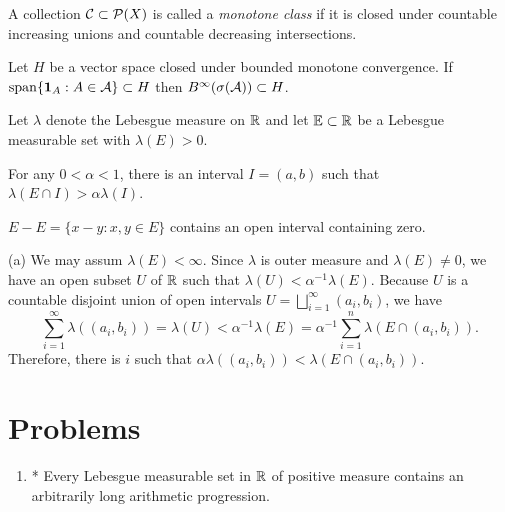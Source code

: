 \documentclass{../../large}
\begin{document}
\begin{prb}
A collection $\mathcal{C}\subset\mathcal{P}(X)$ is called a \emph{monotone class} if it is closed under countable increasing unions and countable decreasing intersections.

Let $H$ be a vector space closed under bounded monotone convergence.
If $\operatorname{span}\{\mathbf{1}_A:A\in\mathcal{A}\}\subset H$ then $B^\infty(\sigma(\mathcal{A}))\subset H$.
\end{prb}



\begin{prb}
Let $\lambda$ denote the Lebesgue measure on $\mathbb{R}$ and let $\mathbb{E}\subset\mathbb{R}$ be a Lebesgue measurable set with $\lambda(E)>0$.
\begin{parts}
\item For any $0<\alpha<1$, there is an interval $I=(a,b)$ such that $\lambda(E\cap I)>\alpha\lambda(I)$.
\item $E-E=\{x-y:x,y\in E\}$ contains an open interval containing zero.
\end{parts}
\begin{pf}
(a)
We may assum $\lambda(E)<\infty$.
Since $\lambda$ is outer measure and $\lambda(E)\ne0$, we have an open subset $U$ of $\mathbb{R}$ such that $\lambda(U)<\alpha^{-1}\lambda(E)$.
Because $U$ is a countable disjoint union of open intervals $U=\bigsqcup_{i=1}^\infty(a_i,b_i)$, we have
\[\sum_{i=1}^\infty\lambda((a_i,b_i))=\lambda(U)<\alpha^{-1}\lambda(E)=\alpha^{-1}\sum_{i=1}^n\lambda(E\cap(a_i,b_i)).\]
Therefore, there is $i$ such that $\alpha\lambda((a_i,b_i))<\lambda(E\cap(a_i,b_i))$.
\end{pf}
\end{prb}




\section*{Problems}
\begin{enumerate}
\item* Every Lebesgue measurable set in $\mathbb{R}$ of positive measure contains an arbitrarily long arithmetic progression.
\end{enumerate}
\end{document}
